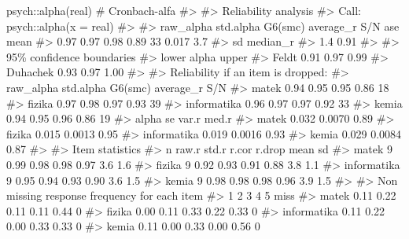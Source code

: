 \documentclass[
  letterpaper,
]{krantz}
\makeatletter
\newenvironment{Shaded}{\begin{snugshade}}{\end{snugshade}}
\newcommand{\CommentTok}[1]{\textcolor[rgb]{0.37,0.37,0.37}{#1}}
\newcommand{\FunctionTok}[1]{\textcolor[rgb]{0.28,0.35,0.67}{#1}}
\newcommand{\NormalTok}[1]{\textcolor[rgb]{0.00,0.23,0.31}{#1}}
\newcommand{\SpecialCharTok}[1]{\textcolor[rgb]{0.37,0.37,0.37}{#1}}
\newenvironment{kframe}{%
\medskip{}
\setlength{\fboxsep}{.8em}
 \def\at@end@of@kframe{}%
 \ifinner\ifhmode%
  \def\at@end@of@kframe{\end{minipage}}%
  \begin{minipage}{\columnwidth}%
 \fi\fi%
 \def\FrameCommand##1{\hskip\@totalleftmargin \hskip-\fboxsep
 \colorbox{shadecolor}{##1}\hskip-\fboxsep
     \hskip-\linewidth \hskip-\@totalleftmargin \hskip\columnwidth}%
 \MakeFramed {\advance\hsize-\width
   \@totalleftmargin\z@ \linewidth\hsize
   \@setminipage}}%
 {\par\unskip\endMakeFramed%
 \at@end@of@kframe}
\renewenvironment{Shaded}{\begin{kframe}}{\end{kframe}}
\makeatother
\begin{document}
\begin{Shaded}
\begin{Highlighting}[]
\NormalTok{psych}\SpecialCharTok{::}\FunctionTok{alpha}\NormalTok{(real)  }\CommentTok{\# Cronbach{-}alfa}
\CommentTok{\#\textgreater{} }
\CommentTok{\#\textgreater{} Reliability analysis   }
\CommentTok{\#\textgreater{} Call: psych::alpha(x = real)}
\CommentTok{\#\textgreater{} }
\CommentTok{\#\textgreater{}   raw\_alpha std.alpha G6(smc) average\_r S/N   ase mean}
\CommentTok{\#\textgreater{}       0.97      0.97    0.98      0.89  33 0.017  3.7}
\CommentTok{\#\textgreater{}   sd median\_r}
\CommentTok{\#\textgreater{}  1.4     0.91}
\CommentTok{\#\textgreater{} }
\CommentTok{\#\textgreater{}     95\% confidence boundaries }
\CommentTok{\#\textgreater{}          lower alpha upper}
\CommentTok{\#\textgreater{} Feldt     0.91  0.97  0.99}
\CommentTok{\#\textgreater{} Duhachek  0.93  0.97  1.00}
\CommentTok{\#\textgreater{} }
\CommentTok{\#\textgreater{}  Reliability if an item is dropped:}
\CommentTok{\#\textgreater{}             raw\_alpha std.alpha G6(smc) average\_r S/N}
\CommentTok{\#\textgreater{} matek            0.94      0.95    0.95      0.86  18}
\CommentTok{\#\textgreater{} fizika           0.97      0.98    0.97      0.93  39}
\CommentTok{\#\textgreater{} informatika      0.96      0.97    0.97      0.92  33}
\CommentTok{\#\textgreater{} kemia            0.94      0.95    0.96      0.86  19}
\CommentTok{\#\textgreater{}             alpha se  var.r med.r}
\CommentTok{\#\textgreater{} matek          0.032 0.0070  0.89}
\CommentTok{\#\textgreater{} fizika         0.015 0.0013  0.95}
\CommentTok{\#\textgreater{} informatika    0.019 0.0016  0.93}
\CommentTok{\#\textgreater{} kemia          0.029 0.0084  0.87}
\CommentTok{\#\textgreater{} }
\CommentTok{\#\textgreater{}  Item statistics }
\CommentTok{\#\textgreater{}             n raw.r std.r r.cor r.drop mean  sd}
\CommentTok{\#\textgreater{} matek       9  0.99  0.98  0.98   0.97  3.6 1.6}
\CommentTok{\#\textgreater{} fizika      9  0.92  0.93  0.91   0.88  3.8 1.1}
\CommentTok{\#\textgreater{} informatika 9  0.95  0.94  0.93   0.90  3.6 1.5}
\CommentTok{\#\textgreater{} kemia       9  0.98  0.98  0.98   0.96  3.9 1.5}
\CommentTok{\#\textgreater{} }
\CommentTok{\#\textgreater{} Non missing response frequency for each item}
\CommentTok{\#\textgreater{}                1    2    3    4    5 miss}
\CommentTok{\#\textgreater{} matek       0.11 0.22 0.11 0.11 0.44    0}
\CommentTok{\#\textgreater{} fizika      0.00 0.11 0.33 0.22 0.33    0}
\CommentTok{\#\textgreater{} informatika 0.11 0.22 0.00 0.33 0.33    0}
\CommentTok{\#\textgreater{} kemia       0.11 0.00 0.33 0.00 0.56    0}
\end{Highlighting}
\end{Shaded}
\end{document}
